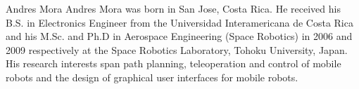 \documentclass[journal]{IEEEtran}
\begin{document}
\ifCLASSOPTIONcaptionsoff
\newpage
\fi


%
%
%







\begin{IEEEbiography}{Andres Mora}
Andres Mora was born in San Jose, Costa Rica. He received his B.S. in Electronics Engineer from the Universidad Interamericana de Costa Rica and his M.Sc. and Ph.D in Aerospace Engineering (Space Robotics) in 2006 and 2009 respectively at the Space Robotics Laboratory, Tohoku University, Japan. His research interests span path planning, teleoperation and control of mobile robots and the design of graphical user interfaces for mobile robots.
\end{IEEEbiography}
\end{document}
